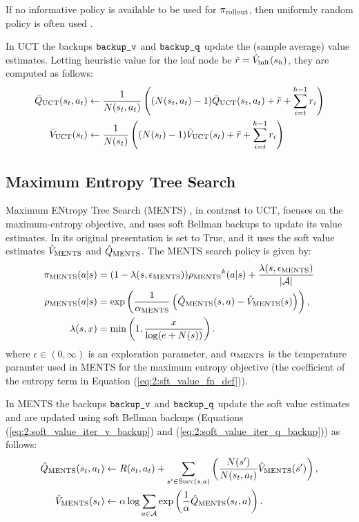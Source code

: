         If no informative policy is available to be used for ${\pi_{{\textnormal{rollout}}}}$, then uniformly random policy is often used \cite{mcts_survey,rand_mc_est_orig}.

        In UCT the backups ${\textnormal{\texttt{backup\_v}}}$ and ${\textnormal{\texttt{backup\_q}}}$ update the (sample average) value estimates. Letting heuristic value for the leaf node be $\tilde{r} = {\hat{V}_{\textnormal{init}}}(s_h)$, they are computed as follows:
        \begin{align}
            {\bar{Q}_{{\textnormal{UCT}}}}(s_t,a_t) &\leftarrow 
                \frac{1}{N(s_t,a_t)} \left( (N(s_t,a_t)-1) {\bar{Q}_{{\textnormal{UCT}}}}(s_t,a_t) 
                    + \tilde{r} + \sum_{i=t}^{h-1} r_i \right) \label{eq:2:uct_backup_q} \\
            {\bar{V}_{{\textnormal{UCT}}}}(s_t) &\leftarrow 
                \frac{1}{N(s_t)} \left( (N(s_t)-1) {\bar{V}_{{\textnormal{UCT}}}}(s_t) 
                    + \tilde{r} + \sum_{i=t}^{h-1} r_i \right) \label{eq:2:uct_backup_v} 
        \end{align}  








    \subsection{Maximum Entropy Tree Search}
    \label{sec:2-4-3-ments}

        Maximum ENtropy Tree Search (MENTS) \cite{ments}, in contrast to UCT, focuses on the maximum-entropy objective, and uses soft Bellman backups to update its value estimates. In its original presentation \mctsmode\ewe is set to True, and it uses the soft value estimates ${\hat{V}_{{\textnormal{MENTS}}}}$ and ${\hat{Q}_{{\textnormal{MENTS}}}}$. The MENTS search policy is given by:
        \begin{align}
            {\pi_{{\textnormal{MENTS}}}}(a|s) &= 
                (1-{\lambda(s,{\epsilon_{{\textnormal{MENTS}}}})}){\rho_{{\textnormal{MENTS}}}}^k(a|s) + \frac{{\lambda(s,{\epsilon_{{\textnormal{MENTS}}}})}}{|\mathcal{A}|} \label{eq:2:ments_policy} \\
            {\rho_{{\textnormal{MENTS}}}}(a|s) &= 
                \exp\left(\frac{1}{{\alpha_{{\textnormal{MENTS}}}}}\left({\hat{Q}_{{\textnormal{MENTS}}}}(s,a)-{\hat{V}_{{\textnormal{MENTS}}}}(s)\right)\right), \\
            \lambda(s,x) &= \min\left(1,\frac{x}{\log(e+N(s))}\right).
        \end{align}
        where $\epsilon \in (0,\infty)$ is an exploration parameter, and ${\alpha_{{\textnormal{MENTS}}}}$ is the temperature paramter used in MENTS for the maximum entropy objective (the coefficient of the entropy term in Equation (\ref{eq:2:sft_value_fn_def})).

        In MENTS the backups ${\textnormal{\texttt{backup\_v}}}$ and ${\textnormal{\texttt{backup\_q}}}$ update the soft value estimates and are updated using soft Bellman backups (Equations (\ref{eq:2:soft_value_iter_v_backup}) and (\ref{eq:2:soft_value_iter_q_backup})) as follows:
        \begin{align}
            {\hat{Q}_{{\textnormal{MENTS}}}}(s_t,a_t) &\leftarrow 
                R(s_t,a_t) + \sum_{s'\in{\textnormal{Succ}(s,a)}} \left( \frac{N(s')}{N(s_t,a_t)} {\hat{V}_{{\textnormal{MENTS}}}}(s') \right), \label{eq:2:ments_backup_q} \\
            {\hat{V}_{{\textnormal{MENTS}}}}(s_t) &\leftarrow 
                \alpha \log \sum_{a\in\mathcal{A}} \exp \left(\frac{1}{\alpha}{\hat{Q}_{{\textnormal{MENTS}}}}(s_t,a) \right). \label{eq:2:ments_backup_v} 
        \end{align}

